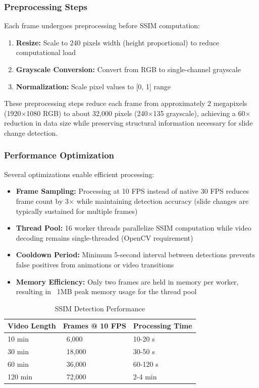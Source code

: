 \subsubsection{Preprocessing Steps}

Each frame undergoes preprocessing before SSIM computation:

\begin{enumerate}
    \item \textbf{Resize:} Scale to 240 pixels width (height proportional) to reduce computational load
    \item \textbf{Grayscale Conversion:} Convert from RGB to single-channel grayscale
    \item \textbf{Normalization:} Scale pixel values to [0, 1] range
\end{enumerate}

These preprocessing steps reduce each frame from approximately 2 megapixels (1920$\times$1080 RGB) to about 32,000 pixels (240$\times$135 grayscale), achieving a 60$\times$ reduction in data size while preserving structural information necessary for slide change detection.

\subsubsection{Performance Optimization}

Several optimizations enable efficient processing:

\begin{itemize}
    \item \textbf{Frame Sampling:} Processing at 10 FPS instead of native 30 FPS reduces frame count by 3$\times$ while maintaining detection accuracy (slide changes are typically sustained for multiple frames)
    \item \textbf{Thread Pool:} 16 worker threads parallelize SSIM computation while video decoding remains single-threaded (OpenCV requirement)
    \item \textbf{Cooldown Period:} Minimum 5-second interval between detections prevents false positives from animations or video transitions
    \item \textbf{Memory Efficiency:} Only two frames are held in memory per worker, resulting in ~1MB peak memory usage for the thread pool
\end{itemize}

\begin{table}[H]
    \centering
    \caption{SSIM Detection Performance}
    \begin{tabular}{@{}lll@{}}
        \toprule
        \textbf{Video Length} & \textbf{Frames @ 10 FPS} & \textbf{Processing Time} \\ \midrule
        10 min & ~6,000 & 10-20 s \\
        30 min & ~18,000 & 30-50 s \\
        60 min & ~36,000 & 60-120 s \\
        120 min & ~72,000 & 2-4 min \\ \bottomrule
    \end{tabular}
\end{table}

